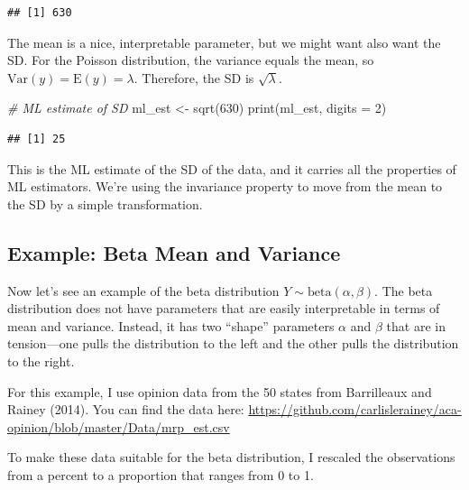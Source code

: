 \documentclass[
]{book}
\newenvironment{Shaded}{\begin{snugshade}}{\end{snugshade}}
\newcommand{\AttributeTok}[1]{\textcolor[rgb]{0.77,0.63,0.00}{#1}}
\newcommand{\CommentTok}[1]{\textcolor[rgb]{0.56,0.35,0.01}{\textit{#1}}}
\newcommand{\DecValTok}[1]{\textcolor[rgb]{0.00,0.00,0.81}{#1}}
\newcommand{\FunctionTok}[1]{\textcolor[rgb]{0.00,0.00,0.00}{#1}}
\newcommand{\NormalTok}[1]{#1}
\newcommand{\OtherTok}[1]{\textcolor[rgb]{0.56,0.35,0.01}{#1}}
\begin{document}
\begin{verbatim}
## [1] 630
\end{verbatim}

The mean is a nice, interpretable parameter, but we might want also want
the SD. For the Poisson distribution, the variance equals the mean, so
\(\text{Var}(y) = \text{E}(y) = \lambda\). Therefore, the SD is
\(\sqrt{\lambda}\).

\begin{Shaded}
\begin{Highlighting}[]
\CommentTok{\# ML estimate of SD}
\NormalTok{ml\_est }\OtherTok{\textless{}{-}} \FunctionTok{sqrt}\NormalTok{(}\DecValTok{630}\NormalTok{)}
\FunctionTok{print}\NormalTok{(ml\_est, }\AttributeTok{digits =} \DecValTok{2}\NormalTok{)}
\end{Highlighting}
\end{Shaded}

\begin{verbatim}
## [1] 25
\end{verbatim}

This is the ML estimate of the SD of the data, and it carries all the
properties of ML estimators. We're using the invariance property to move
from the mean to the SD by a simple transformation.

\hypertarget{example-beta-mean-and-variance}{%
\subsection{Example: Beta Mean and
Variance}\label{example-beta-mean-and-variance}}

Now let's see an example of the beta distribution
\(Y \sim \text{beta}(\alpha, \beta)\). The beta distribution does not
have parameters that are easily interpretable in terms of mean and
variance. Instead, it has two ``shape'' parameters \(\alpha\) and
\(\beta\) that are in tension---one pulls the distribution to the left
and the other pulls the distribution to the right.

For this example, I use opinion data from the 50 states from Barrilleaux
and Rainey (2014). You can find the data here:
\url{https://github.com/carlislerainey/aca-opinion/blob/master/Data/mrp_est.csv}

To make these data suitable for the beta distribution, I rescaled the
observations from a percent to a proportion that ranges from 0 to 1.
\end{document}
